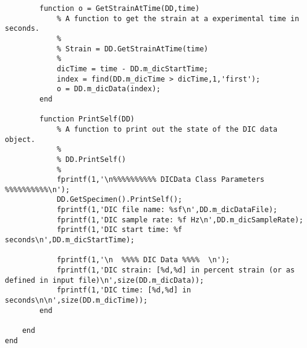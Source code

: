 \begin{lstlisting}
        function o = GetStrainAtTime(DD,time)
            % A function to get the strain at a experimental time in seconds.
            %
            % Strain = DD.GetStrainAtTime(time)
            %
            dicTime = time - DD.m_dicStartTime;
            index = find(DD.m_dicTime > dicTime,1,'first');
            o = DD.m_dicData(index);
        end
        
        function PrintSelf(DD)
            % A function to print out the state of the DIC data object.
            %
            % DD.PrintSelf()
            %
            fprintf(1,'\n%%%%%%%%%% DICData Class Parameters %%%%%%%%%%\n');
            DD.GetSpecimen().PrintSelf();
            fprintf(1,'DIC file name: %sf\n',DD.m_dicDataFile);
            fprintf(1,'DIC sample rate: %f Hz\n',DD.m_dicSampleRate);
            fprintf(1,'DIC start time: %f seconds\n',DD.m_dicStartTime);
            
            fprintf(1,'\n  %%%% DIC Data %%%%  \n');
            fprintf(1,'DIC strain: [%d,%d] in percent strain (or as defined in input file)\n',size(DD.m_dicData));
            fprintf(1,'DIC time: [%d,%d] in seconds\n\n',size(DD.m_dicTime));
        end
            
    end
end
    
\end{lstlisting}

